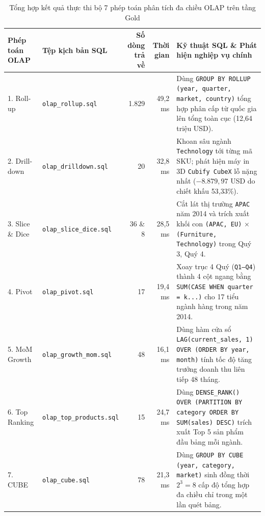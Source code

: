 \begin{table}[H]
\centering
\caption{Tổng hợp kết quả thực thi bộ 7 phép toán phân tích đa chiều OLAP trên tầng Gold}
\label{tab:olap_suite}
\footnotesize
\renewcommand{\arraystretch}{1.22}
\begin{tabularx}{\textwidth}{|l|l|r|r|X|}
\hline
\textbf{Phép toán OLAP} & \textbf{Tệp kịch bản SQL} & \textbf{Số dòng trả về} & \textbf{Thời gian} & \textbf{Kỹ thuật SQL \& Phát hiện nghiệp vụ chính} \\
\hline
1. Roll-up & \texttt{olap\_rollup.sql} & 1.829 & 49,2 ms & Dùng \texttt{GROUP BY ROLLUP (year, quarter, market, country)} tổng hợp phân cấp từ quốc gia lên tổng toàn cục (12,64 triệu USD). \\
\hline
2. Drill-down & \texttt{olap\_drilldown.sql} & 20 & 32,8 ms & Khoan sâu ngành \texttt{Technology} tới từng mã SKU; phát hiện máy in 3D \texttt{Cubify CubeX} lỗ nặng nhất ($-8.879,97$ USD do chiết khấu 53,33\%). \\
\hline
3. Slice \& Dice & \texttt{olap\_slice\_dice.sql} & 36 \& 8 & 28,5 ms & Cắt lát thị trường \texttt{APAC} năm 2014 và trích xuất khối con \texttt{(APAC, EU)} $\times$ \texttt{(Furniture, Technology)} trong Quý 3, Quý 4. \\
\hline
4. Pivot & \texttt{olap\_pivot.sql} & 17 & 19,4 ms & Xoay trục 4 Quý (\texttt{Q1--Q4}) thành 4 cột ngang bằng \texttt{SUM(CASE WHEN quarter = k...)} cho 17 tiểu ngành hàng trong năm 2014. \\
\hline
5. MoM Growth & \texttt{olap\_growth\_mom.sql} & 48 & 16,1 ms & Dùng hàm cửa sổ \texttt{LAG(current\_sales, 1) OVER (ORDER BY year, month)} tính tốc độ tăng trưởng doanh thu liên tiếp 48 tháng. \\
\hline
6. Top Ranking & \texttt{olap\_top\_products.sql} & 15 & 24,7 ms & Dùng \texttt{DENSE\_RANK() OVER (PARTITION BY category ORDER BY SUM(sales) DESC)} trích xuất Top 5 sản phẩm đầu bảng mỗi ngành. \\
\hline
7. CUBE & \texttt{olap\_cube.sql} & 78 & 21,3 ms & Dùng \texttt{GROUP BY CUBE (year, category, market)} sinh đồng thời $2^3 = 8$ cấp độ tổng hợp đa chiều chỉ trong một lần quét bảng. \\
\hline
\end{tabularx}
\end{table}

